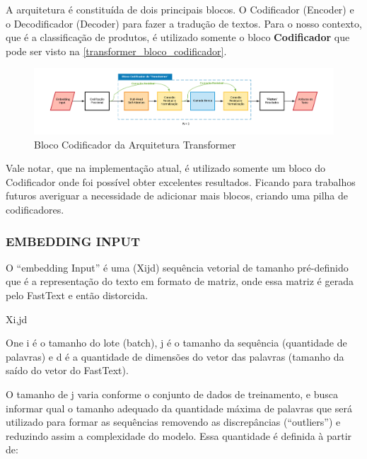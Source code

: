 A arquitetura é constituída de dois principais blocos. O Codificador (Encoder) e o Decodificador (Decoder) para fazer a tradução de textos. Para o nosso contexto, que é a classificação de produtos, é utilizado somente o bloco \textbf{Codificador} que pode ser visto na \autoref{transformer_bloco_codificador}.

\begin{figure}[htb]
	\caption{\label{transformer_bloco_codificador} Bloco Codificador da Arquitetura Transformer}
	\begin{center}
	    \includegraphics[scale=0.5]{artigo/recursos/imagens/transformer_bloco_codificador.png}
	\end{center}
\end{figure}

Vale notar, que na implementação atual, é utilizado somente um bloco do Codificador onde foi possível obter excelentes resultados. Ficando para trabalhos futuros averiguar a necessidade de adicionar mais blocos, criando uma pilha de codificadores.

\subsubsection{EMBEDDING INPUT}

O “embedding Input” é uma (Xijd) sequência vetorial de tamanho pré-definido que é a representação do texto em formato de matriz, onde essa matriz é gerada pelo FastText e então distorcida.

Xi,jd

One i é o tamanho do lote (batch), j é o tamanho da sequência (quantidade de palavras) e d é a quantidade de dimensões do vetor das palavras (tamanho da saído do vetor do FastText). 

O tamanho de j varia conforme o conjunto de dados de treinamento, e busca informar qual o tamanho adequado da quantidade máxima de palavras que será utilizado para formar as sequências removendo as discrepâncias (“outliers”) e reduzindo assim a complexidade do modelo. Essa quantidade é definida à partir de:


